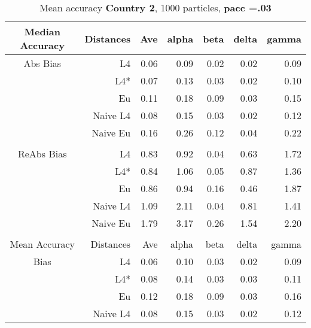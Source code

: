 \documentclass[a4paper,12pt,twoside]{book}
\begin{document}
\begin{table}[H]

\centering
\vfill
\caption{Mean  accuracy \textbf{Country 2}, 1000 particles, \textbf{pacc =.03}}


\begin{tabular}{crrrrrr}
  \hline
  
{\color{blue}Median Accuracy} & Distances & Ave & alpha & beta & delta & gamma \\ 
  \hline
{\color{blue}Abs Bias} & L4  & 0.06 & 0.09 & 0.02 & 0.02 & 0.09 \\ 
  
&L4*  &0.07 & 0.13 & 0.03 & 0.02 & 0.10 \\ 
 
&Eu &  0.11 & 0.18 & 0.09 & 0.03 & 0.15 \\ 
  
&Naive L4&     0.08 & 0.15 & 0.03 & 0.02 & 0.12 \\ 
  
&Naive Eu &  0.16 & 0.26 & 0.12 & 0.04 & 0.22 \\ \\
  
   \hline
   
{\color{blue} ReAbs Bias } & L4  &0.83 & 0.92 & 0.04 & 0.63 & 1.72 \\ 
  
&L4*  &0.84 & 1.06 & 0.05 & 0.87 & 1.36 \\ 
 
&Eu &   
  0.86 & 0.94 & 0.16 & 0.46 & 1.87 \\ 
   
&Naive L4&   1.09 & 2.11 & 0.04 & 0.81 & 1.41 \\
   
&Naive Eu &    1.79 & 3.17 & 0.26 & 1.54 & 2.20 \\ \\
 
   \hline
{\color{blue}Mean Accuracy} & Distances & Ave & alpha & beta & delta & gamma \\ 
  \hline
{\color{blue}Bias} & L4  &0.06 & 0.10 & 0.03 & 0.02 & 0.09 \\ 
  
&L4*  &0.08 & 0.14 & 0.03 & 0.03 & 0.11 \\ 
  
  
&Eu & 0.12 & 0.18 & 0.09 & 0.03 & 0.16 \\ 
  
&Naive L4&  
  0.08 & 0.15 & 0.03 & 0.02 & 0.12 \\
  

\end{tabular}
\end{table}
\end{document}

